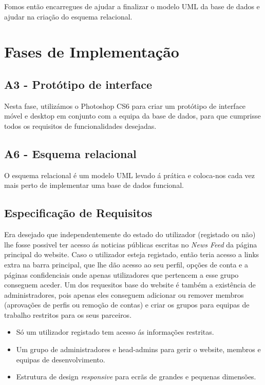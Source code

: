 \documentclass[11pt]{report}
\begin{document}
Fomos então encarregues de ajudar a finalizar o modelo UML da base de dados e  ajudar na criação do esquema relacional.


\section{Fases de Implementação}

\subsection{A3 - Protótipo de interface}
	Nesta fase, utilizámos o Photoshop CS6 para criar um protótipo de interface móvel e desktop em conjunto com a equipa da base de dados, para que cumprisse todos os requisitos de funcionalidades desejadas.
	
	
\subsection{A6 - Esquema relacional}
	O esquema relacional é um modelo UML levado á prática e coloca-nos cada vez mais perto de implementar uma base de dados funcional.


\subsection{Especificação de Requisitos}

Era desejado que independentemente do estado do utilizador (registado ou não) lhe fosse possivel ter acesso ás noticias públicas escritas no \textit{News Feed} da página principal do website.
Caso o utilizador esteja registado, então teria acesso a links extra na barra principal, que lhe dão acesso ao seu perfil, opções de conta e a páginas confidenciais onde apenas utilizadores que pertencem a esse grupo conseguem aceder.
Um dos requesitos base do website é também a existência de administradores, pois apenas eles conseguem adicionar ou remover membros (aprovações de perfis ou remoção de contas) e criar os grupos para equipas de trabalho restritos para os seus parceiros.

\begin{itemize}
		
\item Só um utilizador registado tem acesso ás informações restritas.

\item Um grupo de administradores e head-admins para gerir o website, membros e equipas de desenvolvimento.

\item Estrutura de design \textit{responsive} para ecrãs de grandes e pequenas dimensões.
\end{itemize}
\end{document}
